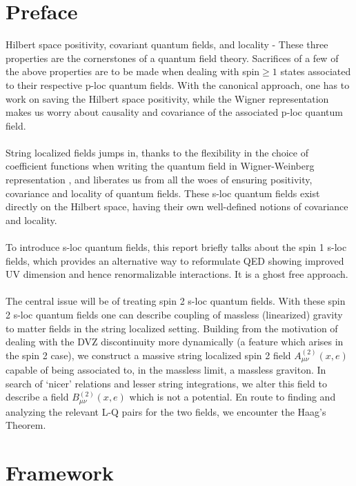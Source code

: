 \documentclass[12pt,a4paper]{article}
\numberwithin{equation}{section}
\begin{document}
\section{Preface}
Hilbert space positivity, covariant quantum fields, and locality - These three properties are the cornerstones of a quantum field theory. Sacrifices of a few of the above properties are to be made when dealing with spin$\geq1$ states associated to their respective p-loc quantum fields. With the canonical approach, one has to work on saving the Hilbert space positivity, while the Wigner representation makes us worry about causality and covariance of the associated p-loc quantum field. \\\\
String localized fields jumps in, thanks to the flexibility in the choice of coefficient functions when writing the quantum field in Wigner-Weinberg representation \cite{weinberg_1995}, and liberates us from all the woes of ensuring positivity, covariance and locality of quantum fields. These s-loc quantum fields exist directly on the Hilbert space, having their own well-defined notions of covariance and locality.\\\\
To introduce s-loc quantum fields, this report briefly talks about the spin 1 s-loc fields, which provides an alternative way to reformulate QED showing improved UV dimension and hence renormalizable interactions. It is a ghost free approach.\\\\  
The central issue will be of treating spin 2 s-loc quantum fields. With these spin 2 s-loc quantum fields one can describe coupling of massless (linearized) gravity to matter fields in the string localized setting. 
Building from the motivation of dealing with the DVZ discontinuity more dynamically (a feature which arises in the spin 2 case), we construct a massive string localized spin 2 field $A^{(2)}_{\mu\nu}(x,e)$ capable of being associated to, in the massless limit, a massless graviton. In search of `nicer' relations and lesser string integrations, we alter this field to describe a field $B^{(2)}_{\mu\nu}(x,e)$ which is not a potential. En route to finding and analyzing the relevant L-Q pairs for the two fields, we encounter the Haag's Theorem.          
\newpage
 
\section{Framework}
\end{document}
